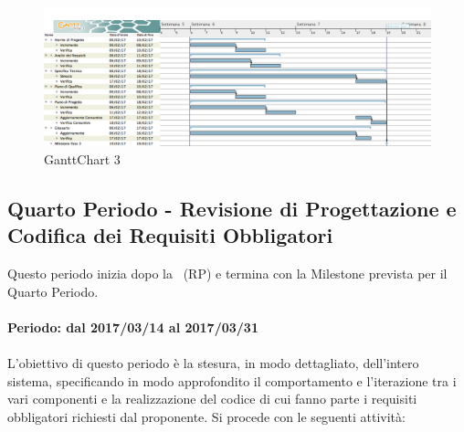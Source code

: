 \documentclass[../PianoDiProgetto_v4.0.0.tex]{subfiles}
\begin{document}
	\newpage
	\begin{figure}[!h]
		\centering
		\includegraphics[width=\textwidth]{Pianificazione/Immagini/GanttChart03.png}
		\caption{GanttChart 3}
	\end{figure}	
	
\subsection{Quarto Periodo - Revisione di Progettazione e Codifica dei Requisiti Obbligatori}
	Questo periodo inizia dopo la \revisionediprogettazione\ (RP) e termina con la Milestone prevista per il Quarto Periodo.
	\\
	\\
	\textbf{Periodo: dal 2017/03/14 al 2017/03/31}
	\\
	\\
	L'obiettivo di questo periodo è la stesura, in modo dettagliato, dell'intero sistema, specificando in modo approfondito il comportamento e l'iterazione tra i vari componenti e la realizzazione del codice di cui fanno parte i requisiti obbligatori richiesti dal proponente.
	Si procede con le seguenti attività:
\end{document}
